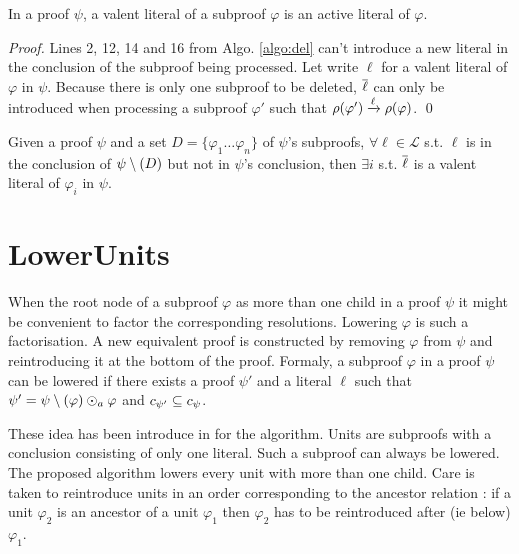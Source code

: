 \documentclass{llncs}
\begin{document}
\begin{proposition} \label{prop:valentactive}
In a proof $\psi$, a valent literal of a subproof $\varphi$ is an active literal of $\varphi$.
\end{proposition}

\begin{proof}
Lines 2, 12, 14 and 16 from Algo. \ref{algo:del} can't introduce a new literal in the conclusion of
the subproof being processed. Let write $\ell$ for a valent literal of $\varphi$ in $\psi$. Because
there is only one subproof to be deleted, $\overline{\ell}$ can only be introduced when processing a
subproof $\varphi'$ such that $\rho(\varphi') \xrightarrow{\ell} \rho(\varphi)$. \qed
\end{proof}

\begin{proposition}
Given a proof $\psi$ and a set $D = \{\varphi_1 \ldots \varphi_n\}$ of $\psi$'s subproofs, $\forall
\ell \in \mathcal{L}$ s.t. $\ell$ is in the conclusion of $\psi \setminus (D)$ but not in $\psi$'s
conclusion, then $\exists i$ s.t. $\overline{\ell}$ is a valent literal of $\varphi_i$ in $\psi$.
\end{proposition}



\section{LowerUnits}

When the root node of a subproof $\varphi$ as more than one child in a proof $\psi$ it might be
convenient to factor the corresponding resolutions. Lowering $\varphi$ is such a factorisation. A
new equivalent proof is constructed by removing $\varphi$ from $\psi$ and reintroducing it at the
bottom of the proof. Formaly, a subproof $\varphi$ in a proof $\psi$ can be lowered if there exists
a proof $\psi'$ and a literal $\ell$ such that $\psi' = \psi \setminus (\varphi) \odot_a \varphi$ and
$c_{\psi'} \subseteq c_{\psi}$.

These idea has been introduce in \cite{LURPI} for the {\LowerUnits} algorithm. Units are subproofs
with a conclusion consisting of only one literal. Such a subproof can always be lowered. The
proposed algorithm lowers every unit with more than one child. Care is taken to reintroduce units in
an order corresponding to the ancestor relation : if a unit $\varphi_2$ is an ancestor of a unit
$\varphi_1$ then $\varphi_2$ has to be reintroduced after (ie below) $\varphi_1$.
\end{document}
